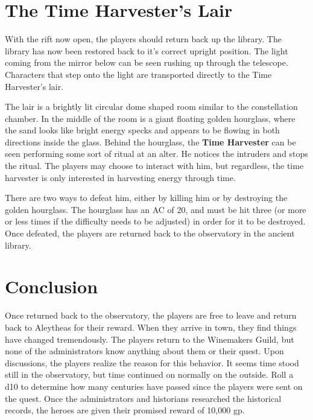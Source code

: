 \documentclass{article}
\begin{document}
\begin{multicols*}{2}
	\section{The Time Harvester's Lair}
	With the rift now open, the players should return back up the library. The library has now been restored back to it's correct upright position. The light coming from the mirror below can be seen rushing up through the telescope. Characters that step onto the light are transported directly to the Time Harvester's lair.
	
	The lair is a brightly lit circular dome shaped room similar to the constellation chamber. In the middle of the room is a giant floating golden hourglass, where the sand looks like bright energy specks and appears to be flowing in both directions inside the glass. Behind the hourglass, the \textbf{Time Harvester} can be seen performing some sort of ritual at an alter. He notices the intruders and stops the ritual. The players may choose to interact with him, but regardless, the time harvester is only interested in harvesting energy through time.
	
	There are two ways to defeat him, either by killing him or by destroying the golden hourglass. The hourglass has an AC of 20, and must be hit three (or more or less times if the difficulty needs to be adjusted) in order for it to be destroyed. Once defeated, the players are returned back to the observatory in the ancient library. 
	
	\section{Conclusion}
	Once returned back to the observatory, the players are free to leave and return back to Aleytheas for their reward. When they arrive in town, they find things have changed tremendously. The players return to the Winemakers Guild, but none of the administrators know anything about them or their quest. Upon discussions, the players realize the reason for this behavior. It seems time stood still in the observatory, but time continued on normally on the outside. Roll a d10 to determine how many centuries have passed since the players were sent on the quest. Once the administrators and historians researched the historical records, the heroes are given their promised reward of 10,000 gp.
	\vfill

	\pagebreak
	
	
\end{multicols*}
	
\end{document}
